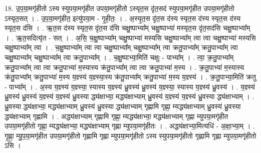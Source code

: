 \documentclass[17pt]{extarticle}
\begin{document}
18. उ॒प॒या॒मगृ॑हीतो ऽस्य स्युपया॒मगृ॑हीत उपया॒मगृ॑हीतो ऽस्यृत॒स दृ॑त॒सद॑ स्युपया॒मगृ॑हीत उपया॒मगृ॑हीतो ऽस्यृत॒सत् । . उ॒प॒या॒मगृ॑हीत॒ इत्यु॑पया॒म - गृ॒ही॒तः॒ । . अ॒स्यृ॒त॒स दृ॑त॒स द॑स्य स्यृत॒स द॑स्य स्यृत॒स द॑स्य स्यृत॒स द॑सि । . ऋ॒त॒स द॑स्य स्यृत॒स दृ॑त॒स द॑सि चक्षु॒ष्पाभ्या᳚म् चक्षु॒ष्पाभ्या॑ मस्यृत॒स दृ॑त॒सद॑सि चक्षु॒ष्पाभ्या᳚म् । . ऋ॒त॒सदित्यृ॑त - सत् । . अ॒सि॒ च॒क्षु॒ष्पाभ्या᳚म् चक्षु॒ष्पाभ्या॑ मस्यसि चक्षु॒ष्पाभ्या᳚म् त्वा त्वा चक्षु॒ष्पाभ्या॑ मस्यसि चक्षु॒ष्पाभ्या᳚म् त्वा । . च॒क्षु॒ष्पाभ्या᳚म् त्वा त्वा चक्षु॒ष्पाभ्या᳚म् चक्षु॒ष्पाभ्या᳚म् त्वा क्रतु॒पाभ्या᳚म् क्रतु॒पाभ्या᳚म् त्वा चक्षु॒ष्पाभ्या᳚म् चक्षु॒ष्पाभ्या᳚म् त्वा क्रतु॒पाभ्या᳚म् । . च॒क्षु॒ष्पाभ्या॒मिति॑ चक्षुः - पाभ्या᳚म् । . त्वा॒ क्र॒तु॒पाभ्या᳚म् क्रतु॒पाभ्या᳚म् त्वा त्वा क्रतु॒पाभ्या॑ म॒स्यास्य क्र॑तु॒पाभ्या᳚म् त्वा त्वा क्रतु॒पाभ्या॑ म॒स्य । . क्र॒तु॒पाभ्या॑ म॒स्यास्य क्र॑तु॒पाभ्या᳚म् क्रतु॒पाभ्या॑ म॒स्य य॒ज्ञ्स्य॑ य॒ज्ञ्स्या॒स्य क्र॑तु॒पाभ्या᳚म् क्रतु॒पाभ्या॑ म॒स्य य॒ज्ञ्स्य॑ । . क्र॒तु॒पाभ्या॒मिति॑ क्रतु - पाभ्या᳚म् । . अ॒स्य य॒ज्ञ्स्य॑ य॒ज्ञ्स्या॒ स्यास्य य॒ज्ञ्स्य॑ ध्रु॒वस्य॑ ध्रु॒वस्य॑ य॒ज्ञ्स्या॒ स्यास्य य॒ज्ञ्स्य॑ ध्रु॒वस्य॑ । . य॒ज्ञ्स्य॑ ध्रु॒वस्य॑ ध्रु॒वस्य॑ य॒ज्ञ्स्य॑ य॒ज्ञ्स्य॑ ध्रु॒वस्या द्ध्य॑क्षाभ्या॒ मद्ध्य॑क्षाभ्याम् ध्रु॒वस्य॑ य॒ज्ञ्स्य॑ य॒ज्ञ्स्य॑ ध्रु॒वस्या द्ध्य॑क्षाभ्याम् । . ध्रु॒वस्या द्ध्य॑क्षाभ्या॒ मद्ध्य॑क्षाभ्याम् ध्रु॒वस्य॑ ध्रु॒वस्या द्ध्य॑क्षाभ्याम् गृह्णामि गृह्णा॒ म्यद्ध्य॑क्षाभ्याम् ध्रु॒वस्य॑ ध्रु॒वस्या द्ध्य॑क्षाभ्याम् गृह्णामि । . अद्ध्य॑क्षाभ्याम् गृह्णामि गृह्णा॒ म्यद्ध्य॑क्षाभ्या॒ मद्ध्य॑क्षाभ्याम् गृह्णा म्युपया॒मगृ॑हीत उपया॒मगृ॑हीतो गृह्णा॒ म्यद्ध्य॑क्षाभ्या॒ मद्ध्य॑क्षाभ्याम् गृह्णा म्युपया॒मगृ॑हीतः । . अद्ध्य॑क्षाभ्या॒मित्यधि॑ - अ॒क्षा॒भ्या॒म् । . गृ॒ह्णा॒ म्यु॒प॒या॒मगृ॑हीत उपया॒मगृ॑हीतो गृह्णामि गृह्णा म्युपया॒मगृ॑हीतो ऽस्य स्युपया॒मगृ॑हीतो गृह्णामि गृह्णा म्युपया॒मगृ॑हीतो ऽसि । \newline
\end{document}
